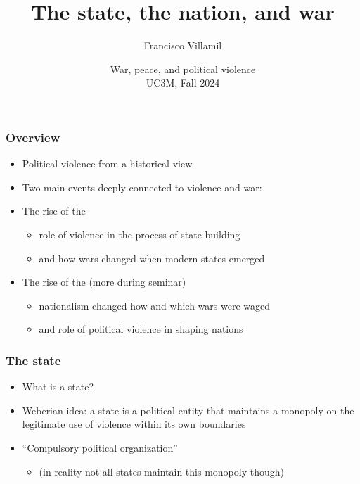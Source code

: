 \documentclass[aspectratio=43, handout]{beamer}
\title{\huge The state, the nation, and war}
\author{Francisco Villamil}
\date{War, peace, and political violence\\UC3M, Fall 2024}
\begin{document}
\begin{frame}
  \titlepage
\end{frame}

\begin{frame}
\frametitle{Overview}
\centering

\begin{itemize}
  \item Political violence from a historical view
  \item Two main events deeply connected to violence and war:
  \item<2->[1.] The rise of the 
  \begin{itemize}
    \item role of violence in the process of state-building
    \item and how wars changed when modern states emerged
  \end{itemize}
  \item<3->[2.] The rise of the  (more during seminar)
  \begin{itemize}
    \item nationalism changed how and which wars were waged
    \item and role of political violence in shaping nations
  \end{itemize}
\end{itemize}

\end{frame}



\begin{frame}
\frametitle{The state}
\centering

\begin{itemize}
\item What is a state?
\item<2-> Weberian idea: a state is a political entity that maintains a monopoly on the legitimate use of violence within its own boundaries
\item<2-> ``Compulsory political organization''
\begin{itemize}
  \item<2-> (in reality not all states maintain this monopoly though)
\end{itemize}

\end{itemize}

\end{frame}
\end{document}
